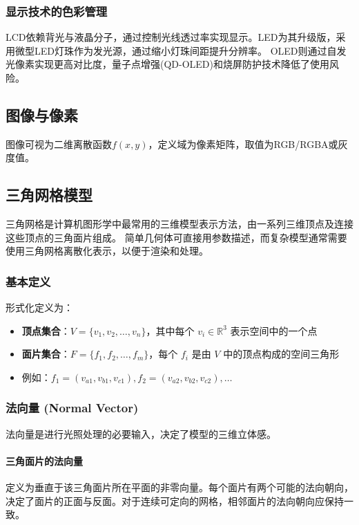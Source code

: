 \documentclass[12pt]{article}
\begin{document}
\subsubsection{显示技术的色彩管理}
LCD依赖背光与液晶分子，通过控制光线透过率实现显示。LED为其升级版，采用微型LED灯珠作为发光源，通过缩小灯珠间距提升分辨率。
OLED则通过自发光像素实现更高对比度，量子点增强(QD-OLED)和烧屏防护技术降低了使用风险。

\subsection{图像与像素}

图像可视为二维离散函数$f(x,y)$，定义域为像素矩阵，取值为RGB/RGBA或灰度值。

\subsection{三角网格模型}

三角网格是计算机图形学中最常用的三维模型表示方法，由一系列三维顶点及连接这些顶点的三角面片组成。
简单几何体可直接用参数描述，而复杂模型通常需要使用三角网格离散化表示，以便于渲染和处理。

\subsubsection{基本定义}
形式化定义为：
\begin{itemize}[label=--]
    \item \textbf{顶点集合}：$V = \{v_1, v_2, \dots, v_n\}$，其中每个 $v_i \in \mathbb{R}^3$ 表示空间中的一个点
    \item \textbf{面片集合}：$F = \{f_1, f_2, \dots, f_m\}$，每个 $f_i$ 是由 $V$ 中的顶点构成的空间三角形
    \item 例如：$f_1 = (v_{a1}, v_{b1}, v_{c1}), f_2 = (v_{a2}, v_{b2}, v_{c2}), \dots$
\end{itemize}

\subsubsection{法向量 (Normal Vector)}

法向量是进行光照处理的必要输入，决定了模型的三维立体感。

\paragraph{三角面片的法向量}
定义为垂直于该三角面片所在平面的非零向量。每个面片有两个可能的法向朝向，决定了面片的正面与反面。对于连续可定向的网格，相邻面片的法向朝向应保持一致。
\end{document}
